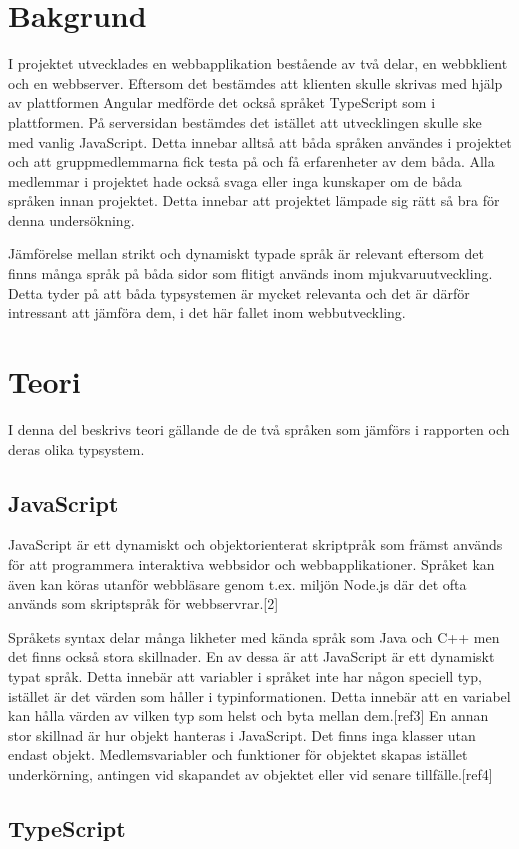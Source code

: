 \section{Bakgrund}
I projektet utvecklades en webbapplikation bestående av två delar, en webbklient och en webbserver. Eftersom det bestämdes att klienten skulle skrivas med hjälp av plattformen Angular medförde det också språket TypeScript som i plattformen. På serversidan bestämdes det istället att utvecklingen skulle ske med vanlig JavaScript. Detta innebar alltså att båda språken användes i projektet och att gruppmedlemmarna fick testa på och få erfarenheter av dem båda. Alla medlemmar i projektet hade också svaga eller inga kunskaper om de båda språken innan projektet. Detta innebar att projektet lämpade sig rätt så bra för denna undersökning.

Jämförelse mellan strikt och dynamiskt typade språk är relevant eftersom det finns många språk på båda sidor som flitigt används inom mjukvaruutveckling. Detta tyder på att båda typsystemen är mycket relevanta och det är därför intressant att jämföra dem, i det här fallet inom webbutveckling.
\section{Teori}
I denna del beskrivs teori gällande de de två språken som jämförs i rapporten och deras olika typsystem.
\subsection{JavaScript}
JavaScript är ett dynamiskt och objektorienterat skriptpråk som främst används för att programmera interaktiva webbsidor och webbapplikationer. Språket kan även kan köras utanför webbläsare genom t.ex. miljön Node.js där det ofta används som skriptspråk för webbservrar.\cite{henrik_js1}[2]

Språkets syntax delar många likheter med kända språk som Java och C++ men det finns också stora skillnader. En av dessa är att JavaScript är ett dynamiskt typat språk. Detta innebär att variabler i språket inte har någon speciell typ, istället är det värden som håller i typinformationen. Detta innebär att en variabel kan hålla värden av vilken typ som helst och byta mellan dem.[ref3] En annan stor skillnad är hur objekt hanteras i JavaScript. Det finns inga klasser utan endast objekt. Medlemsvariabler och funktioner för objektet skapas istället underkörning, antingen vid skapandet av objektet eller vid senare tillfälle.[ref4]
\subsection{TypeScript}
